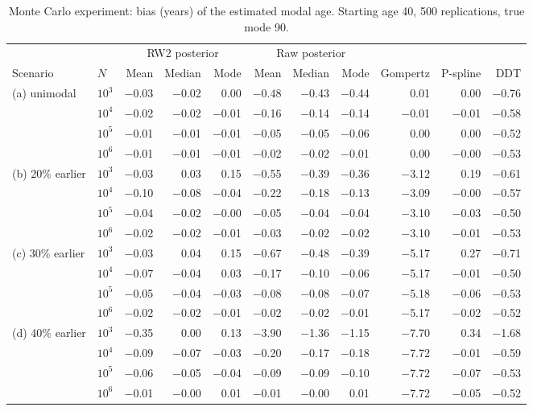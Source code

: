 \begin{table}[htb!]
\centering
\caption{Monte Carlo experiment: bias (years) of the estimated modal age. Starting age 40, 500 replications, true mode 90.}
\label{tab:app_bias}
\scriptsize
\setlength{\tabcolsep}{4pt}
\begin{tabular}{llrrrrrrrrr}
\hline
 & & \multicolumn{3}{c}{RW2 posterior} & \multicolumn{3}{c}{Raw posterior} & & & \\
Scenario & $N$ & Mean & Median & Mode & Mean & Median & Mode & Gompertz & P-spline & DDT \\
\hline
(a) unimodal & $10^3$ & $-$0.03 & $-$0.02 & 0.00 & $-$0.48 & $-$0.43 & $-$0.44 & 0.01 & 0.00 & $-$0.76 \\
 & $10^4$ & $-$0.02 & $-$0.02 & $-$0.01 & $-$0.16 & $-$0.14 & $-$0.14 & $-$0.01 & $-$0.01 & $-$0.58 \\
 & $10^5$ & $-$0.01 & $-$0.01 & $-$0.01 & $-$0.05 & $-$0.05 & $-$0.06 & 0.00 & 0.00 & $-$0.52 \\
 & $10^6$ & $-$0.01 & $-$0.01 & $-$0.01 & $-$0.02 & $-$0.02 & $-$0.01 & 0.00 & $-$0.00 & $-$0.53 \\[2pt]
(b) 20\% earlier & $10^3$ & $-$0.03 & 0.03 & 0.15 & $-$0.55 & $-$0.39 & $-$0.36 & $-$3.12 & 0.19 & $-$0.61 \\
 & $10^4$ & $-$0.10 & $-$0.08 & $-$0.04 & $-$0.22 & $-$0.18 & $-$0.13 & $-$3.09 & $-$0.00 & $-$0.57 \\
 & $10^5$ & $-$0.04 & $-$0.02 & $-$0.00 & $-$0.05 & $-$0.04 & $-$0.04 & $-$3.10 & $-$0.03 & $-$0.50 \\
 & $10^6$ & $-$0.02 & $-$0.02 & $-$0.01 & $-$0.03 & $-$0.02 & $-$0.02 & $-$3.10 & $-$0.01 & $-$0.53 \\[2pt]
(c) 30\% earlier & $10^3$ & $-$0.03 & 0.04 & 0.15 & $-$0.67 & $-$0.48 & $-$0.39 & $-$5.17 & 0.27 & $-$0.71 \\
 & $10^4$ & $-$0.07 & $-$0.04 & 0.03 & $-$0.17 & $-$0.10 & $-$0.06 & $-$5.17 & $-$0.01 & $-$0.50 \\
 & $10^5$ & $-$0.05 & $-$0.04 & $-$0.03 & $-$0.08 & $-$0.08 & $-$0.07 & $-$5.18 & $-$0.06 & $-$0.53 \\
 & $10^6$ & $-$0.02 & $-$0.02 & $-$0.01 & $-$0.02 & $-$0.02 & $-$0.01 & $-$5.17 & $-$0.02 & $-$0.52 \\[2pt]
(d) 40\% earlier & $10^3$ & $-$0.35 & 0.00 & 0.13 & $-$3.90 & $-$1.36 & $-$1.15 & $-$7.70 & 0.34 & $-$1.68 \\
 & $10^4$ & $-$0.09 & $-$0.07 & $-$0.03 & $-$0.20 & $-$0.17 & $-$0.18 & $-$7.72 & $-$0.01 & $-$0.59 \\
 & $10^5$ & $-$0.06 & $-$0.05 & $-$0.04 & $-$0.09 & $-$0.09 & $-$0.10 & $-$7.72 & $-$0.07 & $-$0.53 \\
 & $10^6$ & $-$0.01 & $-$0.00 & 0.01 & $-$0.01 & $-$0.00 & 0.01 & $-$7.72 & $-$0.05 & $-$0.52 \\
\hline
\end{tabular}
\end{table}
